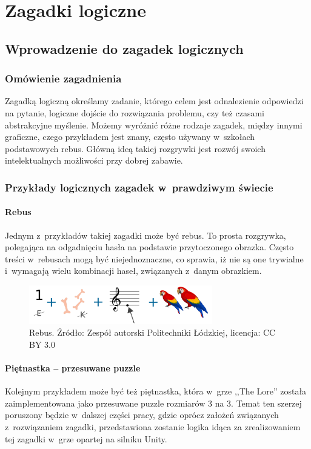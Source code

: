\documentclass[oneside,polski,logo]{amuthesis}
\begin{document}
\chapter{Zagadki logiczne}
\section{Wprowadzenie do zagadek logicznych}
\subsection{Omówienie zagadnienia}
\par Zagadką logiczną określamy zadanie, którego celem jest odnalezienie odpowiedzi na pytanie, logiczne dojście do rozwiązania problemu, czy też czasami abstrakcyjne myślenie. Możemy wyróżnić różne rodzaje zagadek, między innymi graficzne, czego przykładem jest znany, często używany w~szkołach podstawowych rebus. Główną ideą takiej rozgrywki jest rozwój swoich intelektualnych możliwości przy dobrej zabawie. \cite{zagadka_logiczna}

\subsection{Przykłady logicznych zagadek w~prawdziwym świecie}
\subsubsection{Rebus}
\par Jednym z~przykładów takiej zagadki może być rebus. To prosta rozgrywka, polegająca na odgadnięciu hasła na podstawie przytoczonego obrazka. Często treści w~rebusach mogą być niejednoznaczne, co sprawia, iż nie są one trywialne i~wymagają wielu kombinacji haseł, związanych z~danym obrazkiem. \cite{rebus}

\begin{figure}[h]
\centering
\includegraphics[width=8cm]{images/tyrek/rebus.png}
\caption{Rebus. Źródło: Zespół autorski Politechniki Łódzkiej, licencja: CC BY 3.0}
\end{figure}

\subsubsection{Piętnastka – przesuwane puzzle}
\par Kolejnym przykładem może być też piętnastka, która w~grze ,,The Lore'' została zaimplementowana jako przesuwane puzzle rozmiarów 3 na 3. Temat ten szerzej poruszony będzie w~dalszej części pracy, gdzie oprócz założeń związanych z~rozwiązaniem zagadki, przedstawiona zostanie logika idąca za zrealizowaniem tej zagadki w~grze opartej na silniku Unity. 
\end{document}

